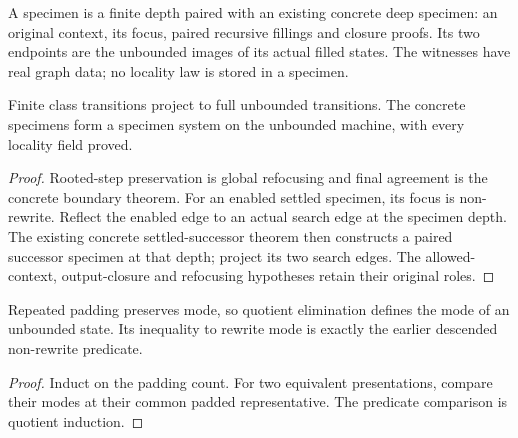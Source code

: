 \begin{definition}
A specimen is a finite depth paired with an existing concrete deep specimen: an original context, its focus, paired recursive fillings and closure proofs. Its two endpoints are the unbounded images of its actual filled states. The witnesses have real graph data; no locality law is stored in a specimen.
\end{definition}





\begin{lemma}
Finite class transitions project to full unbounded transitions. The concrete specimens form a specimen system on the unbounded machine, with every locality field proved.
\end{lemma}

\begin{proof}
Rooted-step preservation is global refocusing and final agreement is the concrete boundary theorem. For an enabled settled specimen, its focus is non-rewrite. Reflect the enabled edge to an actual search edge at the specimen depth. The existing concrete settled-successor theorem then constructs a paired successor specimen at that depth; project its two search edges. The allowed-context, output-closure and refocusing hypotheses retain their original roles.
\end{proof}




\begin{lemma}
Repeated padding preserves mode, so quotient elimination defines the mode of an unbounded state. Its inequality to rewrite mode is exactly the earlier descended non-rewrite predicate.
\end{lemma}

\begin{proof}
Induct on the padding count. For two equivalent presentations, compare their modes at their common padded representative. The predicate comparison is quotient induction.
\end{proof}

